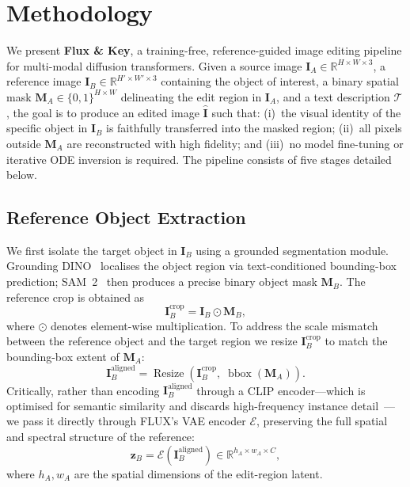 \section{Methodology}

We present \textbf{Flux \& Key}, a training-free, reference-guided image editing pipeline for
multi-modal diffusion transformers. Given a source image
$\mathbf{I}_A \in \mathbb{R}^{H \times W \times 3}$, a reference image
$\mathbf{I}_B \in \mathbb{R}^{H' \times W' \times 3}$ containing the object of interest, a
binary spatial mask $\mathbf{M}_A \in \{0,1\}^{H \times W}$ delineating the edit region in
$\mathbf{I}_A$, and a text description $\mathcal{T}$, the goal is to produce an edited image
$\hat{\mathbf{I}}$ such that:
(i)~the visual identity of the specific object in $\mathbf{I}_B$ is faithfully transferred into
the masked region;
(ii)~all pixels outside $\mathbf{M}_A$ are reconstructed with high fidelity; and
(iii)~no model fine-tuning or iterative ODE inversion is required.
The pipeline consists of five stages detailed below.

\subsection{Reference Object Extraction}

We first isolate the target object in $\mathbf{I}_B$ using a grounded segmentation module.
Grounding DINO~\cite{liu2023grounding} localises the object region via text-conditioned
bounding-box prediction; SAM~2~\cite{ravi2024sam2} then produces a precise binary object
mask $\mathbf{M}_B$.
The reference crop is obtained as
\begin{equation}
    \mathbf{I}_B^{\text{crop}} = \mathbf{I}_B \odot \mathbf{M}_B,
    \label{eq:crop}
\end{equation}
where $\odot$ denotes element-wise multiplication.
To address the scale mismatch between the reference object and the target region we resize
$\mathbf{I}_B^{\text{crop}}$ to match the bounding-box extent of $\mathbf{M}_A$:
\begin{equation}
    \mathbf{I}_B^{\text{aligned}} =
        \operatorname{Resize}\!\left(\mathbf{I}_B^{\text{crop}},\;
                                      \operatorname{bbox}(\mathbf{M}_A)\right).
    \label{eq:resize}
\end{equation}
Critically, rather than encoding $\mathbf{I}_B^{\text{aligned}}$ through a CLIP
encoder---which is optimised for semantic similarity and discards high-frequency instance
detail~\cite{radford2021clip}---we pass it directly through FLUX's VAE encoder $\mathcal{E}$,
preserving the full spatial and spectral structure of the reference:
\begin{equation}
    \mathbf{z}_B = \mathcal{E}\!\left(\mathbf{I}_B^{\text{aligned}}\right)
        \in \mathbb{R}^{h_A \times w_A \times C},
    \label{eq:ref_encode}
\end{equation}
where $h_A, w_A$ are the spatial dimensions of the edit-region latent.

